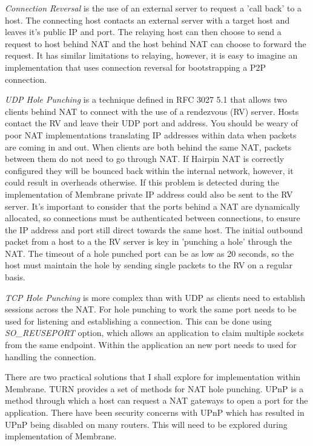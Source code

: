 \documentclass[11pt, a4paper, twocolumn, twoside]{report}
\begin{document}
\emph{Connection Reversal} is the use of an external server to request a 'call back' to a host. The connecting host contacts an external server with a target host and leaves it's public IP and port. The relaying host can then choose to send a request to host behind NAT and the host behind NAT can choose to forward the request. It has similar limitations to relaying, however, it is easy to imagine an implementation that uses connection reversal for bootstrapping a P2P connection.

\emph{UDP Hole Punching} is a technique defined in RFC 3027 5.1 \citep{holdrege2001rfc} that allows two clients behind NAT to connect with the use of a rendezvous (RV) server. Hosts contact the RV and leave their UDP port and address. You should be weary of poor NAT implementations translating IP addresses within data when packets are coming in and out. \citep{ford2005peer} When clients are both behind the same NAT, packets between them do not need to go through NAT. If Hairpin NAT is correctly configured they will be bounced back within the internal network, however, it could result in overheads otherwise. If this problem is detected during the implementation of Membrane private IP address could also be sent to the RV server. It's important to consider that the ports behind a NAT are dynamically allocated, so connections must be authenticated between connections, to ensure the IP address and port still direct towards the same host. The initial outbound packet from a host to a the RV server is key in 'punching a hole' through the NAT. The timeout of a hole punched port can be as low as 20 seconds, so the host must maintain the hole by sending single packets to the RV on a regular basis.

\emph{TCP Hole Punching} is more complex than with UDP as clients need to establish sessions across the NAT. For hole punching to work the same port needs to be used for listening and establishing a connection. This can be done using \emph{SO\_REUSEPORT} option, which allows an application to claim multiple sockets from the same endpoint. Within the application an new port needs to used for handling the connection.

There are two practical solutions that I shall explore for implementation within Membrane. TURN \citep{wing2010traversal} provides a set of methods for NAT hole punching. UPnP \citep{boucadair2013universal} is a method through which a host can request a NAT gateways to open a port for the application. There have been security concerns with UPnP which has resulted in UPnP being disabled on many routers. This will need to be explored during implementation of Membrane.
\end{document}
